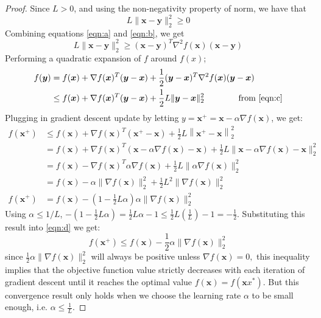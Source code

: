 \documentclass[12pt]{report}
\numberwithin{equation}{section}
\begin{document}
\begin{proof}
\noindent Since $L>0$, and using the non-negativity property of norm, we have that
\begin{equation}\label{eqn:b}
L\|\bm{x}-\bm{y}\|_2^2 \geq 0
\end{equation}
Combining equations \eqref{eqn:a} and \eqref{eqn:b}, we get 
\begin{equation}\label{eqn:c}
L\|\bm{x}-\bm{y}\|_2^2 \geq (\bm{x} - \bm{y})^T \nabla^{2} f(\bm{x}) (\bm{x} - \bm{y})
\end{equation}
Performing a quadratic expansion of $f$ around $f(x)$; 
\begin{equation*}
\begin{split}
f(\bm{y}) & = f(\bm{x})+\nabla f(\bm{x})^{T}(\bm{y}-\bm{x})+\frac{1}{2} (\bm{y}-\bm{x})^T \nabla^{2} f(\bm{x}) (\bm{y}-\bm{x}) \\
& \leq f(\bm{x})+\nabla f(\bm{x})^{T}(\bm{y}-\bm{x})+\frac{1}{2} L\|\bm{y}-\bm{x}\|_{2}^{2} \qquad\qquad \text{from \eqref{eqn:c}}
\end{split}
\end{equation*}
Plugging in  gradient descent update by letting $y=\bm{x}^{+}=\bm{x}- \alpha \nabla f(\bm{x})$, we get:
\begin{equation}\label{eqn:d}
\begin{split}
f(\bm{x}^{+}) & \leq f(\bm{x})+\nabla f(\bm{x})^{T}\left(\bm{x}^{+}-\bm{x}\right)+\frac{1}{2} L\left\|\bm{x}^{+}-\bm{x}\right\|_{2}^{2} \\
&=f(\bm{x})+\nabla f(\bm{x})^{T}(\bm{x}-\alpha\nabla f(\bm{x})-\bm{x})+\frac{1}{2} L\|\bm{x}- \alpha \nabla f(\bm{x})-\bm{x}\|_{2}^{2} \\
&=f(\bm{x})-\nabla f(\bm{x})^{T} \alpha \nabla f(\bm{x})+\frac{1}{2} L\|\alpha \nabla f(\bm{x})\|_{2}^{2} \\
&=f(\bm{x})-\alpha\|\nabla f(\bm{x})\|_{2}^{2}+\frac{1}{2} L^{2}\|\nabla f(\bm{x})\|_{2}^{2} \\
f(\bm{x}^{+}) &=f(\bm{x})-\left(1-\frac{1}{2} L \alpha\right) \alpha\|\nabla f(\bm{x})\|_{2}^{2}
\end{split}
\end{equation}
Using $\alpha \leq 1 / L$,  $-\left(1-\frac{1}{2} L \alpha\right)=\frac{1}{2} L \alpha-1 \leq \frac{1}{2} L\left(\frac{1}{L}\right)-1=-\frac{1}{2}$. Substituting this result into \eqref{eqn:d} we get:
\begin{equation}\label{eqn:e}
f\left(\bm{x}^{+}\right) \leq f(\bm{x})-\frac{1}{2} \alpha\|\nabla f(\bm{x})\|_{2}^{2}
\end{equation}
since $\frac{1}{2} \alpha\|\nabla f(\bm{x})\|_{2}^{2}$ will always be positive unless $\nabla f(\bm{x})=0,$ this inequality implies that the objective function value strictly decreases with each iteration of gradient descent until it reaches the optimal value $f(\bm{x})=f\left(\bm{x}x^{*}\right)$. But this convergence result only holds when we choose the learning rate $\alpha$ to be small enough, i.e. $\alpha \leq \frac{1}{L}$. 


\end{proof}
\end{document}
